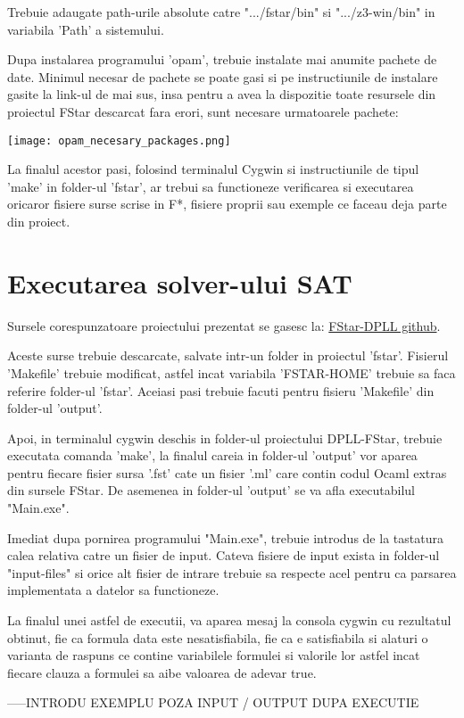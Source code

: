 Trebuie adaugate path-urile absolute catre ".../fstar/bin" si ".../z3-win/bin" in variabila 'Path' a sistemului.

Dupa instalarea programului 'opam', trebuie instalate mai anumite pachete de date. Minimul necesar de pachete se poate gasi si pe instructiunile de instalare gasite la link-ul de mai sus, insa pentru a avea la dispozitie toate resursele din proiectul FStar descarcat fara erori, sunt necesare urmatoarele pachete: 
\newline

\texttt{[image: opam\_necesary\_packages.png]}
\newline

La finalul acestor pasi, folosind terminalul Cygwin si instructiunile de tipul 'make' in folder-ul 'fstar', ar trebui sa functioneze verificarea si executarea oricaror fisiere surse scrise in F*, fisiere proprii sau exemple ce faceau deja parte din proiect.

\newpage

\section{Executarea solver-ului SAT}

Sursele corespunzatoare proiectului prezentat se gasesc la:
\href{https://github.com/alex4482/FStar-DPLL-licenta/tree/main/dpll_optimized}{FStar-DPLL github}.

Aceste surse trebuie descarcate, salvate intr-un folder in proiectul 'fstar'. Fisierul 'Makefile' trebuie modificat, astfel incat variabila 'FSTAR-HOME' trebuie sa faca referire folder-ul 'fstar'. Aceiasi pasi trebuie facuti pentru fisieru 'Makefile' din folder-ul 'output'.

Apoi, in terminalul cygwin deschis in folder-ul proiectului DPLL-FStar, trebuie executata comanda 'make', la finalul careia in folder-ul 'output' vor aparea pentru fiecare fisier sursa '.fst' cate un fisier '.ml' care contin codul Ocaml extras din sursele FStar. De asemenea in folder-ul 'output' se va afla executabilul "Main.exe".

Imediat dupa pornirea programului "Main.exe", trebuie introdus de la tastatura calea relativa catre un fisier de input. Cateva fisiere de input exista in folder-ul "input-files" si orice alt fisier de intrare trebuie sa respecte acel pentru ca parsarea implementata a datelor sa functioneze.

La finalul unei astfel de executii, va aparea mesaj la consola cygwin cu rezultatul obtinut, fie ca formula data este nesatisfiabila, fie ca e satisfiabila si alaturi o varianta de raspuns ce contine variabilele formulei si valorile lor astfel incat fiecare clauza a formulei sa aibe valoarea de adevar true.

-----INTRODU EXEMPLU POZA INPUT / OUTPUT DUPA EXECUTIE
